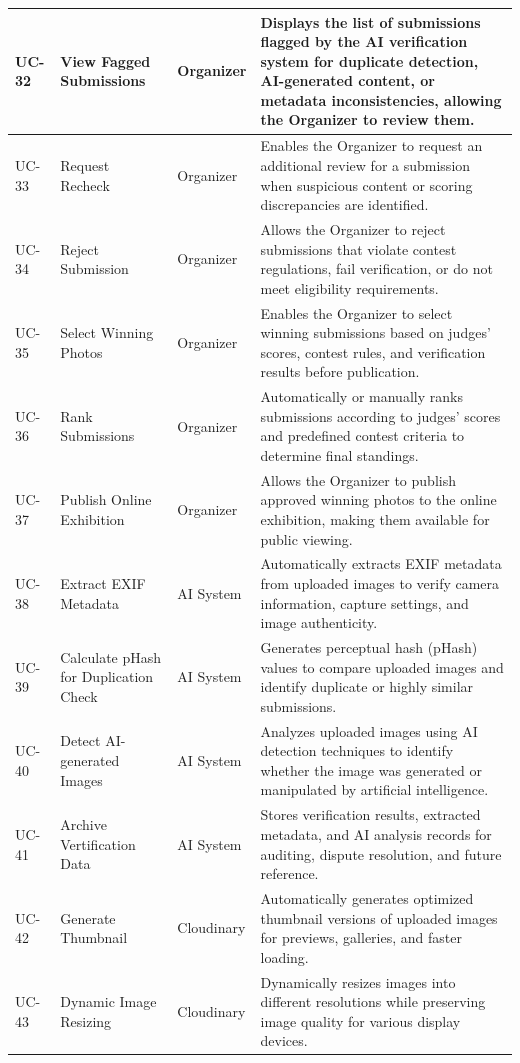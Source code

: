\begin{longtable}{|>{\centering\arraybackslash}p{}|>{\raggedright\arraybackslash}p{}|>{\raggedright\arraybackslash}p{}|>{\raggedright\arraybackslash}p{}|}
\hline
UC-32 & View Fagged Submissions & Organizer & Displays the list of submissions flagged by the AI verification system for duplicate detection, AI-generated content, or metadata inconsistencies, allowing the Organizer to review them. \\
\hline
UC-33 & Request Recheck & Organizer & Enables the Organizer to request an additional review for a submission when suspicious content or scoring discrepancies are identified. \\
\hline
UC-34 & Reject Submission & Organizer & Allows the Organizer to reject submissions that violate contest regulations, fail verification, or do not meet eligibility requirements. \\
\hline
UC-35 & Select Winning Photos & Organizer & Enables the Organizer to select winning submissions based on judges' scores, contest rules, and verification results before publication. \\
\hline
UC-36 & Rank Submissions & Organizer & Automatically or manually ranks submissions according to judges' scores and predefined contest criteria to determine final standings. \\
\hline
UC-37 & Publish Online Exhibition & Organizer & Allows the Organizer to publish approved winning photos to the online exhibition, making them available for public viewing. \\
\hline
UC-38 & Extract EXIF Metadata & AI System & Automatically extracts EXIF metadata from uploaded images to verify camera information, capture settings, and image authenticity. \\
\hline
UC-39 & Calculate pHash for Duplication Check & AI System & Generates perceptual hash (pHash) values to compare uploaded images and identify duplicate or highly similar submissions. \\
\hline
UC-40 & Detect AI-generated Images & AI System & Analyzes uploaded images using AI detection techniques to identify whether the image was generated or manipulated by artificial intelligence. \\
\hline
UC-41 & Archive Vertification Data & AI System & Stores verification results, extracted metadata, and AI analysis records for auditing, dispute resolution, and future reference. \\
\hline
UC-42 & Generate Thumbnail & Cloudinary & Automatically generates optimized thumbnail versions of uploaded images for previews, galleries, and faster loading. \\
\hline
UC-43 & Dynamic Image Resizing & Cloudinary & Dynamically resizes images into different resolutions while preserving image quality for various display devices. \\

\end{longtable}
